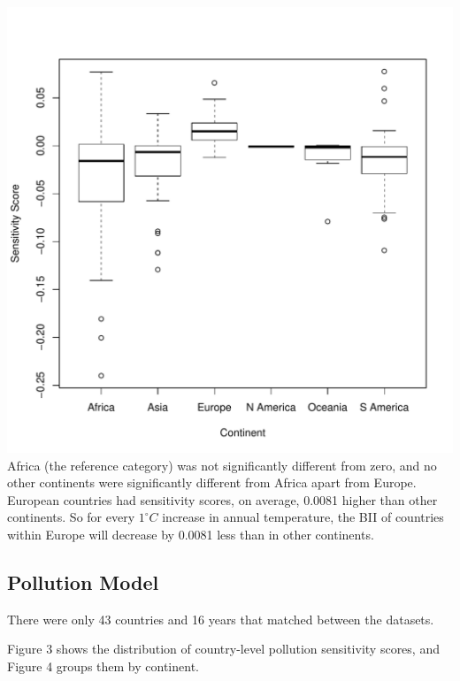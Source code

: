 \documentclass[11pt, a4paper, titlepage]{article}
\begin{document}
	\includegraphics[scale=0.95]{../images/climatesensitivityboxplot.pdf}
	\bigskip
	Africa (the reference category) was not significantly different from zero, and no other continents were significantly different from Africa apart from Europe. European countries had sensitivity scores, on average, 0.0081 higher than other continents. So for every $1^\circ C$ increase in annual temperature, the BII of countries within Europe will decrease by 0.0081 less than in other continents. 
	
	
	\newpage
	\subsection*{Pollution Model}
	
	There were only 43 countries and 16 years that matched between the datasets. \newline
	
	Figure 3 shows the distribution of country-level pollution sensitivity scores, and Figure 4 groups them by continent. \newline
	
\end{document}

